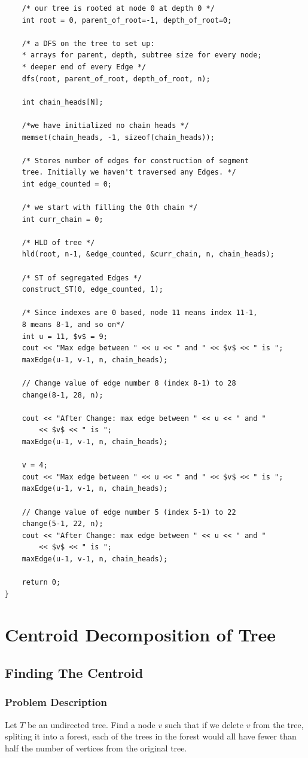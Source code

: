 \documentclass[12pt]{article}
\begin{document}
\begin{verbatim}
	/* our tree is rooted at node 0 at depth 0 */
	int root = 0, parent_of_root=-1, depth_of_root=0; 

	/* a DFS on the tree to set up: 
	* arrays for parent, depth, subtree size for every node; 
	* deeper end of every Edge */
	dfs(root, parent_of_root, depth_of_root, n); 

	int chain_heads[N]; 

	/*we have initialized no chain heads */
	memset(chain_heads, -1, sizeof(chain_heads)); 

	/* Stores number of edges for construction of segment 
	tree. Initially we haven't traversed any Edges. */
	int edge_counted = 0; 

	/* we start with filling the 0th chain */
	int curr_chain = 0; 

	/* HLD of tree */
	hld(root, n-1, &edge_counted, &curr_chain, n, chain_heads); 

	/* ST of segregated Edges */
	construct_ST(0, edge_counted, 1); 

	/* Since indexes are 0 based, node 11 means index 11-1, 
	8 means 8-1, and so on*/
	int u = 11, $v$ = 9; 
	cout << "Max edge between " << u << " and " << $v$ << " is "; 
	maxEdge(u-1, v-1, n, chain_heads); 

	// Change value of edge number 8 (index 8-1) to 28 
	change(8-1, 28, n); 

	cout << "After Change: max edge between " << u << " and "
		<< $v$ << " is "; 
	maxEdge(u-1, v-1, n, chain_heads); 

	v = 4; 
	cout << "Max edge between " << u << " and " << $v$ << " is "; 
	maxEdge(u-1, v-1, n, chain_heads); 

	// Change value of edge number 5 (index 5-1) to 22 
	change(5-1, 22, n); 
	cout << "After Change: max edge between " << u << " and "
		<< $v$ << " is "; 
	maxEdge(u-1, v-1, n, chain_heads); 

	return 0; 
} 
\end{verbatim}


\section{Centroid Decomposition of Tree}
\subsection{Finding The Centroid}
\subsubsection{Problem Description}
Let $T$ be an undirected tree. Find a node $v$ such that if we delete $v$ from
the tree, spliting it into a forest, each of the trees in the forest would all
have fewer than half the number of vertices from the original tree.\cite{9}
\end{document}
